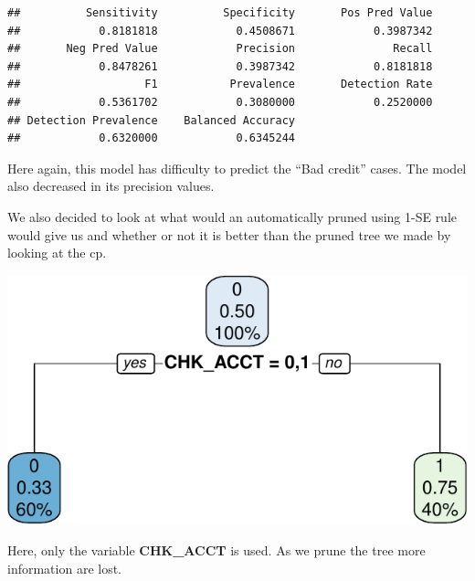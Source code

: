\documentclass[
]{article}
\begin{document}
\begin{verbatim}
##          Sensitivity          Specificity       Pos Pred Value 
##            0.8181818            0.4508671            0.3987342 
##       Neg Pred Value            Precision               Recall 
##            0.8478261            0.3987342            0.8181818 
##                   F1           Prevalence       Detection Rate 
##            0.5361702            0.3080000            0.2520000 
## Detection Prevalence    Balanced Accuracy 
##            0.6320000            0.6345244
\end{verbatim}

Here again, this model has difficulty to predict the ``Bad credit''
cases. The model also decreased in its precision values.

We also decided to look at what would an automatically pruned using 1-SE
rule would give us and whether or not it is better than the pruned tree
we made by looking at the cp.

\begin{center}\includegraphics{report_files/figure-latex/unnamed-chunk-33-1} \end{center}

Here, only the variable \textbf{CHK\_ACCT} is used. As we prune the tree
more information are lost.
\end{document}
